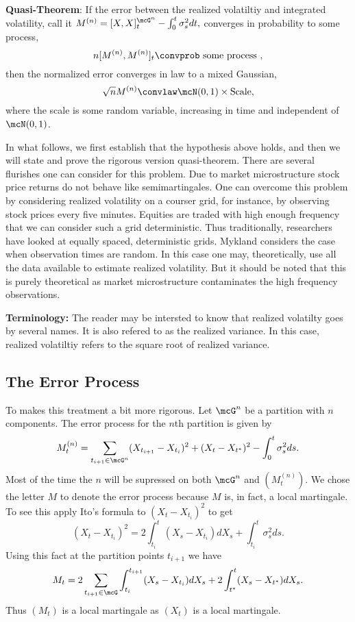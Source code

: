 \documentclass{report}
\begin{document}
\vspace{12pt} \noindent
\textbf{Quasi-Theorem}: If the error between the realized volatiltiy
and integrated volatility, call it 
\(
M^{(n)} =  [X,X]^{\mcG^n}_t - \int_0^t \sigma_s^2 dt,
\)
converges in probability to some process,
\begin{equation}
\label{hypothesis}
n [M^{(n)},M^{(n)}]_t \convprob \textmd{ some process },
\end{equation}
then the normalized error converges in law to a mixed Gaussian,
\begin{equation}
\label{conclusion}
\sqrt{n} M^{(n)} \convlaw \mcN(0,1) \times \textmd{Scale},
\end{equation}
where the scale is some random variable, increasing in time and
independent of $\mcN(0,1)$.

\vspace{10pt} \noindent
In what follows, we first establish that the hypothesis above holds,
and then we will state and prove the rigorous version quasi-theorem. 
There are several flurishes one can consider for this problem.  Due to
market microstructure stock price returns do not behave like
semimartingales.  One can overcome this problem by considering
realized volatility on a courser grid, for instance, by observing
stock prices every five minutes.  Equities are traded with high enough
frequency that we can consider such a grid deterministic.  Thus
traditionally, researchers have looked at equally spaced,
deterministic grids.  Mykland considers the case when observation
times are random.  In this case one may, theoretically, use all the
data available to estimate realized volatility.  But it should be
noted that this is purely theoretical as market microstructure
contaminates the high frequency observations.

\vspace{10pt} \noindent \textbf{Terminology:}  The reader may be
intersted to know that realized volatilty goes by several names.  It
is also refered to as the realized variance.  In this case, realized
volatiltiy refers to the square root of realized variance.

\subsection{The Error Process}

To makes this treatment a bit more rigorous.  Let $\mcG^n$ be a
partition with $n$ components.  The error process for the $n$th
partition is given by
\[
M^{(n)}_t =  \sum_{t_{i+1} \in \mcG^n} (X_{t_{i+1}} - X_{t_i})^2 +
(X_{t} - X_{t^*})^2 - \int_0^t \sigma_s^2 ds.
\]
Most of the time the $n$ will be supressed on both $\mcG^n$ and
$(M_t^{(n)})$.  We chose the letter $M$ to denote the error process
because $M$ is, in fact, a local martingale.  To see this apply Ito's
formula to $(X_t - X_{t_i})^2$ to get
\[
(X_t - X_{t_i})^2 = 2 \int_{t_i}^t (X_s - X_{t_i}) dX_s + \int_{t_i}^t
\sigma_s^2 ds.
\]
Using this fact at the partition points $t_{i+1}$ we have
\[
M_t = 2  \sum_{t_{i+1} \in \mcG} \int_{t_i}^{t_{i+1}} (X_s - X_{t_i})
dX_s + 2 \int_{t^*}^t (X_s - X_{t^*}) dX_s.
\]
Thus $(M_t)$ is a local martingale as $(X_t)$ is a local martingale. 
\end{document}
